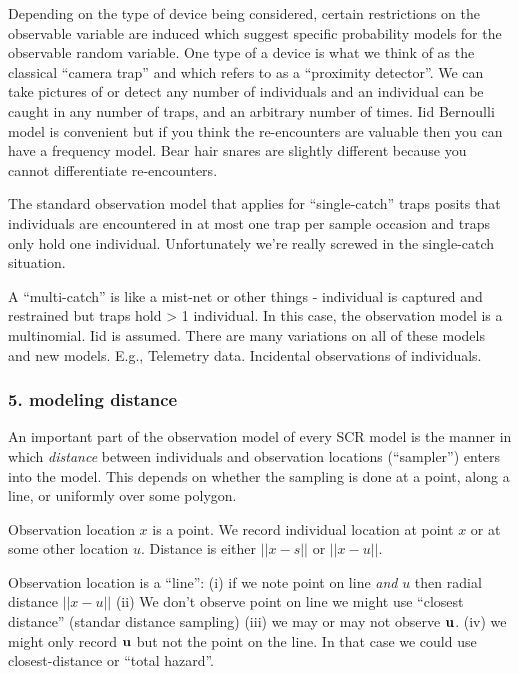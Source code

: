 Depending on the type of device being considered, certain restrictions
on the observable variable are induced which suggest specific
probability models for the observable random variable. One type of a
device is what we think of as the classical ``camera trap'' and which
\citet{efford:2011} refers to as a ``proximity detector''. We can take
pictures of or detect any number of individuals and an individual can
be caught in any number of traps, and an arbitrary number of
times. Iid Bernoulli model is convenient but if you think the
re-encounters are valuable then you can have a frequency model.  Bear
hair snares are slightly different because you cannot differentiate
re-encounters.

The standard observation model that applies for ``single-catch''
\citep{efford_etal:2004} traps posits that individuals are encountered
in at most one trap per sample occasion and traps only hold one
individual.  Unfortunately we're really screwed in the single-catch
situation.

A ``multi-catch'' is like a mist-net or other things - individual is
captured and restrained but traps hold > 1 individual. In this case,
the observation model is a multinomial. Iid is assumed.  There are
many variations on all of these models and new models. E.g., Telemetry
data. Incidental observations of individuals.

\subsubsection{5. modeling distance}

An important part of the observation model of every SCR model is the
manner in which {\it distance} between individuals and observation
locations (``sampler'') enters into the model. 
This depends on whether the sampling is done at a point, along a line,
or uniformly over some polygon.

Observation location $x$ is a point.  We record individual location at
point $x$ or at some other location $u$. Distance is either $||x-s||$
or $||x-u||$.

Observation location is a ``line'':
(i) if we note point on line {\it and} $u$ then radial distance $||x - u||$
(ii) We don't observe point on line we might use ``closest distance''
(standar distance sampling)
(iii) we may or may not observe ${\bf u}$.
(iv) we might only record ${\bf u}$ but not the point on the line. In
that case we could use closest-distance or ``total hazard''.


